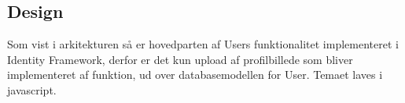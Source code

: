 \subsection{Design}

Som vist i arkitekturen så er hovedparten af Users funktionalitet implementeret i Identity Framework, derfor er det kun upload af profilbillede som bliver implementeret af funktion, ud over databasemodellen for User. Temaet laves i javascript.


